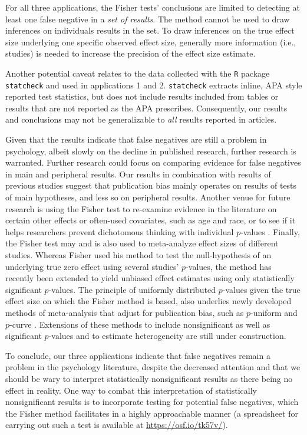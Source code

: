 \documentclass{article}
\begin{document}
For all three applications, the Fisher tests' conclusions are limited to detecting at least one false negative in a \textit{set of results}. The method cannot be used to draw inferences on individuals results in the set. To draw inferences on the true effect size underlying one specific observed effect size, generally more information (i.e., studies) is needed to increase the precision of the effect size estimate.

Another potential caveat relates to the data collected with the \texttt{R} package \texttt{statcheck} and used in applications 1 and 2. \texttt{statcheck} extracts inline, APA style reported test statistics, but does not include results included from tables or results that are not reported as the APA prescribes. Consequently, our results and conclusions may not be generalizable to \textit{all} results reported in articles. 

Given that the results indicate that false negatives are still a problem in psychology, albeit slowly on the decline in published research, further research is warranted. Further research could focus on comparing evidence for false negatives in main and peripheral results. Our results in combination with results of previous studies suggest that publication bias mainly operates on results of tests of main hypotheses, and less so on peripheral results. Another venue for future research is using the Fisher test to re-examine evidence in the literature on certain other effects or often-used covariates, such as age and race, or to see if it helps researchers prevent dichotomous thinking with individual $p$-values \cite{Hoekstra2006}. Finally, the Fisher test may and is also used to meta-analyze effect sizes of different studies. Whereas Fisher used his method to test the null-hypothesis of an underlying true zero effect using several studies' $p$-values, the method has recently been extended to yield unbiased effect estimates using only statistically significant $p$-values. The principle of uniformly distributed $p$-values given the true effect size on which the Fisher method is based, also underlies newly developed methods of meta-analysis that adjust for publication bias, such as $p$-uniform \cite{Van_Assen2015-gg} and $p$-curve \cite{Simonsohn2014-dm}. Extensions of these methods to include nonsignificant as well as significant $p$-values and to estimate heterogeneity are still under construction.

To conclude, our three applications indicate that false negatives remain a problem in the psychology literature, despite the decreased attention and that we should be wary to interpret statistically nonsignificant results as there being no effect in reality. One way to combat this interpretation of statistically nonsignificant results is to incorporate testing for potential false negatives, which the Fisher method facilitates in a highly approachable manner (a spreadsheet for carrying out such a test is available at \url{https://osf.io/tk57v/}).
\end{document}
